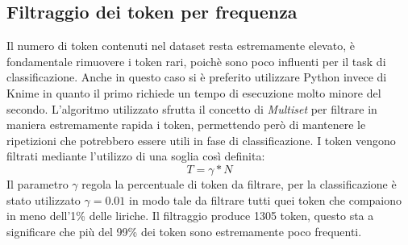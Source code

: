 \documentclass[technote]{IEEEtran}
\begin{document}
\subsection{Filtraggio dei token per frequenza}
Il numero di token contenuti nel dataset resta estremamente elevato, è fondamentale rimuovere i token rari, poichè sono poco influenti per il task di classificazione.
Anche in questo caso si è preferito utilizzare Python invece
di Knime in quanto il primo richiede un tempo di esecuzione molto minore del
secondo.
L'algoritmo utilizzato sfrutta il concetto di \textit{Multiset} per
filtrare in maniera estremamente rapida i token, permettendo però di
mantenere le ripetizioni che potrebbero essere utili in fase di classificazione.
I token vengono filtrati mediante l'utilizzo di una soglia così definita:
\begin{equation}
T = \gamma * N 
\end{equation}
Il parametro $ \gamma $ regola la percentuale di token da filtrare, per
la classificazione è stato utilizzato $ \gamma = 0.01 $ in modo
tale da filtrare tutti quei token che compaiono in meno dell'1\% delle liriche.
Il filtraggio produce 1305 token, questo sta a significare che più
del 99\% dei token sono estremamente poco frequenti.
\end{document}
